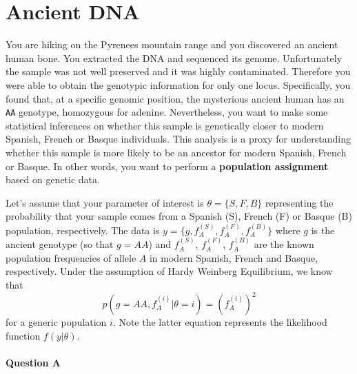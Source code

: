 
\section{Ancient DNA}

You are hiking on the Pyrenees mountain range and you discovered an ancient human bone.
You extracted the DNA and sequenced its genome.
Unfortunately the sample was not well preserved and it was highly contaminated.
Therefore you were able to obtain the genotypic information for only one locus.
Specifically, you found that, at a specific genomic position, the mysterious ancient human has an \texttt{AA} genotype, homozygous for adenine.
Nevertheless, you want to make some statistical inferences on whether this sample is genetically closer to modern Spanish, French or Basque individuals.
This analysis is a proxy for understanding whether this sample is more likely to be an ancestor for modern Spanish, French or Basque.
In other words, you want to perform a \textbf{population assignment} based on genetic data.

Let's assume that your parameter of interest is $\theta=\{S,F,B\}$ representing the probability that your sample comes from a Spanish (S), French (F) or Basque (B) population, respectively.
The data is $y=\{g, f_A^{(S)}, f_A^{(F)}, f_A^{(B)}\}$ where $g$ is the ancient genotype (so that $g=AA$) and $f_A^{(S)}$, $f_A^{(F)}$, $f_A^{(B)}$ are the known population frequencies of allele $A$ in modern Spanish, French and Basque, respectively.
Under the assumption of Hardy Weinberg Equilibrium, we know that
\begin{equation*}
p(g=AA, f_A^{(i)}|\theta=i)=(f_A^{(i)})^2
\end{equation*}
for a generic population $i$.
Note the latter equation represents the likelihood function $f(y|\theta)$.

\paragraph{Question A}

